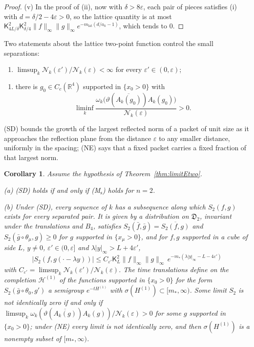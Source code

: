 \documentclass[aps,prd,twocolumn,superscriptaddress,nofootinbib,longbibliography,floatfix,amsmath,amssymb,10pt]{revtex4-2}
\newtheorem{corollary}[theorem]{Corollary}
\theoremstyle{definition}
\theoremstyle{remark}
\newcommand{\R}{\mathbb{R}}
\begin{document}
\begin{proof}
(v) In the proof of (ii), now with $\delta>8\varepsilon$, each pair of
pieces satisfies (i) with $d=\delta/2-4\varepsilon>0$, so the lattice
quantity is at most $\mathsf K_{4L/\delta}^2\mathsf K_{\delta/4}^2\|f\|
_\infty\|g\|_\infty e^{-m_{\mathrm{lat}}(d/a_k-1)}$, which tends to $0$.
\end{proof}

Two statements about the lattice two-point function control the small
separations:
\begin{enumerate}[label=\textup{(SD)},leftmargin=*]
\item $\limsup_k\mathcal N_k(\varepsilon')/\mathcal N_k(\varepsilon)<\infty$
for every $\varepsilon'\in(0,\varepsilon)$;
\end{enumerate}
\begin{enumerate}[label=\textup{(NE)},leftmargin=*]
\item there is $g_0\in C_c(\R^4)$ supported in $\{x_0>0\}$ with
\[
\liminf_k\frac{\omega_k\bigl(\vartheta(\overline{A_k(g_0)})A_k(g_0)\bigr)}
{\mathcal N_k(\varepsilon)}>0 .
\]
\end{enumerate}
(SD) bounds the growth of the largest reflected norm of a packet of unit
size as it approaches the reflection plane from the distance $\varepsilon$
to any smaller distance, uniformly in the spacing; (NE) says that a fixed
packet carries a fixed fraction of that largest norm.

\begin{corollary}\label{cor:limitEtwo}
Assume the hypothesis of Theorem~\textup{\ref{thm:limitEtwo}}.

\textup{(a)} \textup{(SD)} holds if and only if \textup{(M$_{\mathrm s}$)}
holds for $n=2$.

\textup{(b)} Under \textup{(SD)}, every sequence of $k$ has a subsequence
along which $S_2(f,g)$ exists for every separated pair. It is given by a
distribution on $\mathfrak D_2$, invariant under the translations and $B_4$,
satisfies $S_2(\bar f,\bar g)=\overline{S_2(f,g)}$ and
$S_2(\bar g\circ\theta_\mu,g)\ge0$ for $g$ supported in $\{x_\mu>0\}$, and
for $f,g$ supported in a cube of side $L$, $y\ne0$, $\varepsilon'\in(0,
\varepsilon]$ and $\lambda|y|_\infty>L+4\varepsilon'$,
\[
\bigl|S_2(f,g(\cdot-\lambda y))\bigr|\le C_{\varepsilon'}\mathsf K_L^2
\|f\|_\infty\|g\|_\infty\,e^{-m_*(\lambda|y|_\infty-L-4\varepsilon')}
\]
with $C_{\varepsilon'}=\limsup_k\mathcal N_k(\varepsilon')/\mathcal N_k(
\varepsilon)$. The time translations define on the completion
$\mathcal H^{(1)}$ of the functions supported in $\{x_0>0\}$ for the form
$S_2(\bar g\circ\theta_0,g')$ a semigroup $e^{-tH^{(1)}}$ with
$\sigma(H^{(1)})\subset[m_*,\infty)$. Some limit $S_2$ is not identically
zero if and only if $\limsup_k\omega_k(\vartheta(\overline{A_k(g)})A_k(g))
/\mathcal N_k(\varepsilon)>0$ for some $g$ supported in $\{x_0>0\}$; under
\textup{(NE)} every limit is not identically zero, and then
$\sigma(H^{(1)})$ is a nonempty subset of $[m_*,\infty)$.
\end{corollary}
\end{document}
